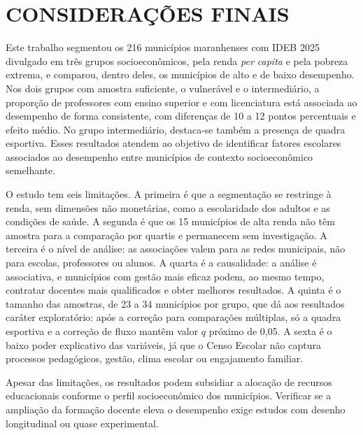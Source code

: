 \section{CONSIDERAÇÕES FINAIS}
\label{sec:consideracoes}

Este trabalho segmentou os 216 municípios maranhenses com IDEB 2025 divulgado em três grupos socioeconômicos, pela renda \textit{per capita} e pela pobreza extrema, e comparou, dentro deles, os municípios de alto e de baixo desempenho. Nos dois grupos com amostra suficiente, o vulnerável e o intermediário, a proporção de professores com ensino superior e com licenciatura está associada ao desempenho de forma consistente, com diferenças de 10 a 12 pontos percentuais e efeito médio. No grupo intermediário, destaca-se também a presença de quadra esportiva. Esses resultados atendem ao objetivo de identificar fatores escolares associados ao desempenho entre municípios de contexto socioeconômico semelhante.

O estudo tem seis limitações. A primeira é que a segmentação se restringe à renda, sem dimensões não monetárias, como a escolaridade dos adultos e as condições de saúde. A segunda é que os 15 municípios de alta renda não têm amostra para a comparação por quartis e permanecem sem investigação. A terceira é o nível de análise: as associações valem para as redes municipais, não para escolas, professores ou alunos. A quarta é a causalidade: a análise é associativa, e municípios com gestão mais eficaz podem, ao mesmo tempo, contratar docentes mais qualificados e obter melhores resultados. A quinta é o tamanho das amostras, de 23 a 34 municípios por grupo, que dá aos resultados caráter exploratório: após a correção para comparações múltiplas, só a quadra esportiva e a correção de fluxo mantêm valor $q$ próximo de 0,05. A sexta é o baixo poder explicativo das variáveis, já que o Censo Escolar não captura processos pedagógicos, gestão, clima escolar ou engajamento familiar.

Apesar das limitações, os resultados podem subsidiar a alocação de recursos educacionais conforme o perfil socioeconômico dos municípios. Verificar se a ampliação da formação docente eleva o desempenho exige estudos com desenho longitudinal ou quase experimental.
